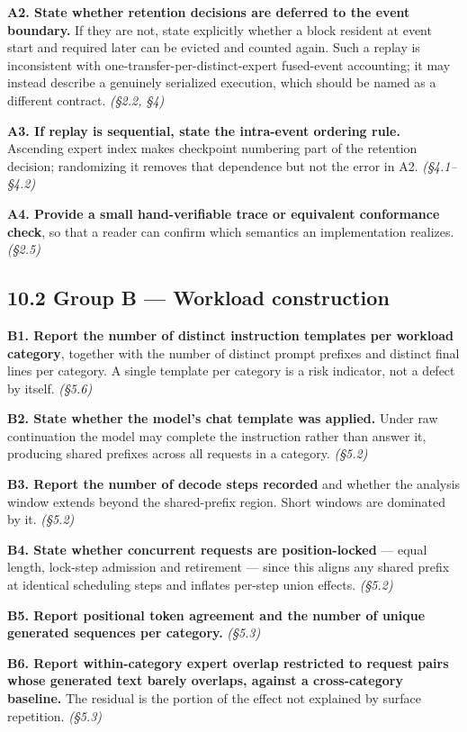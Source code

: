\documentclass[
  10pt,
  letterpaper,
  10pt]{article}
\begin{document}
\textbf{A2. State whether retention decisions are deferred to the event
boundary.} If they are not, state explicitly whether a block resident at
event start and required later can be evicted and counted again. Such a
replay is inconsistent with one-transfer-per-distinct-expert fused-event
accounting; it may instead describe a genuinely serialized execution,
which should be named as a different contract. \emph{(§2.2, §4)}

\textbf{A3. If replay is sequential, state the intra-event ordering
rule.} Ascending expert index makes checkpoint numbering part of the
retention decision; randomizing it removes that dependence but not the
error in A2. \emph{(§4.1--§4.2)}

\textbf{A4. Provide a small hand-verifiable trace or equivalent
conformance check}, so that a reader can confirm which semantics an
implementation realizes. \emph{(§2.5)}

\subsection{10.2 Group B --- Workload
construction}\label{group-b-workload-construction}

\textbf{B1. Report the number of distinct instruction templates per
workload category}, together with the number of distinct prompt prefixes
and distinct final lines per category. A single template per category is
a risk indicator, not a defect by itself. \emph{(§5.6)}

\textbf{B2. State whether the model's chat template was applied.} Under
raw continuation the model may complete the instruction rather than
answer it, producing shared prefixes across all requests in a category.
\emph{(§5.2)}

\textbf{B3. Report the number of decode steps recorded} and whether the
analysis window extends beyond the shared-prefix region. Short windows
are dominated by it. \emph{(§5.2)}

\textbf{B4. State whether concurrent requests are position-locked} ---
equal length, lock-step admission and retirement --- since this aligns
any shared prefix at identical scheduling steps and inflates per-step
union effects. \emph{(§5.2)}

\textbf{B5. Report positional token agreement and the number of unique
generated sequences per category.} \emph{(§5.3)}

\textbf{B6. Report within-category expert overlap restricted to request
pairs whose generated text barely overlaps, against a cross-category
baseline.} The residual is the portion of the effect not explained by
surface repetition. \emph{(§5.3)}
\end{document}
